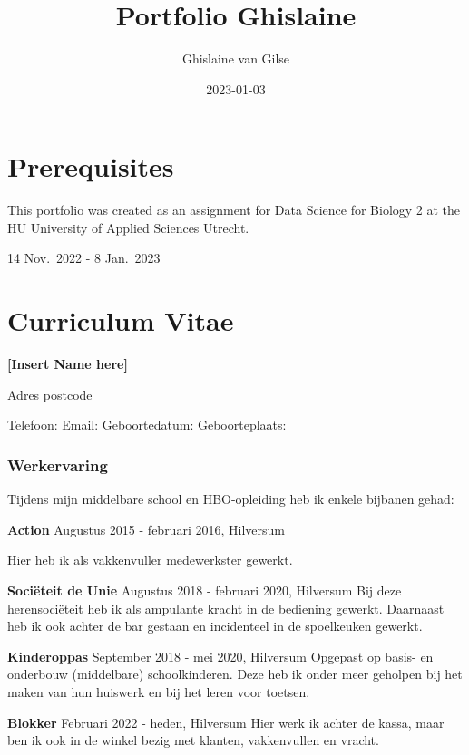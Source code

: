\documentclass[
]{book}
\title{Portfolio Ghislaine}
\author{Ghislaine van Gilse}
\date{2023-01-03}
\begin{document}
\maketitle

{
\setcounter{tocdepth}{1}
\tableofcontents
}
\hypertarget{prerequisites}{%
\chapter*{Prerequisites}\label{prerequisites}}

This portfolio was created as an assignment for Data Science for Biology 2 at the HU University of Applied Sciences Utrecht.

14 Nov.~2022 - 8 Jan.~2023

\hypertarget{curriculum-vitae}{%
\chapter*{Curriculum Vitae}\label{curriculum-vitae}}

\textbf{{[}Insert Name here{]}}

Adres
postcode

Telefoon:
Email:
Geboortedatum:
Geboorteplaats:

\hypertarget{werkervaring}{%
\subsection*{Werkervaring}\label{werkervaring}}

Tijdens mijn middelbare school en HBO-opleiding heb ik enkele bijbanen gehad:

\textbf{Action}
Augustus 2015 - februari 2016, Hilversum

Hier heb ik als vakkenvuller medewerkster gewerkt.

\textbf{Sociëteit de Unie}
Augustus 2018 - februari 2020, Hilversum
Bij deze herensociëteit heb ik als ampulante kracht in de bediening gewerkt. Daarnaast heb ik ook achter de bar gestaan en incidenteel in de spoelkeuken gewerkt.

\textbf{Kinderoppas}
September 2018 - mei 2020, Hilversum
Opgepast op basis- en onderbouw (middelbare) schoolkinderen. Deze heb ik onder meer geholpen bij het maken van hun huiswerk en bij het leren voor toetsen.

\textbf{Blokker}
Februari 2022 - heden, Hilversum
Hier werk ik achter de kassa, maar ben ik ook in de winkel bezig met klanten, vakkenvullen en vracht.
\end{document}
